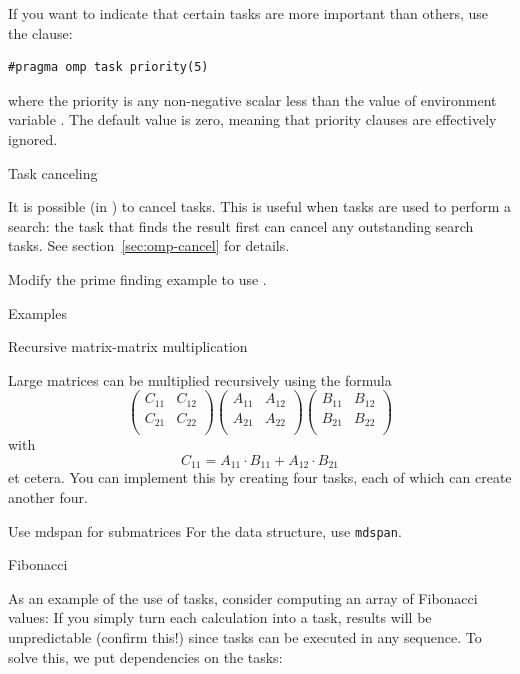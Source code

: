 If you want to indicate that certain tasks are more important
than others, use the  clause:
\begin{lstlisting}[language=omp]
#pragma omp task priority(5)
\end{lstlisting}
where the priority is any non-negative scalar
less than the value of environment variable .
The default value is zero, meaning that priority clauses are effectively ignored.

 {Task canceling}

It is possible (in ) to cancel
tasks. This is useful when tasks are used to perform a search: the
task that finds the result first can cancel any outstanding search
tasks.
See section~\ref{sec:omp-cancel} for details.

\begin{exercise}
  Modify the prime finding example to use .
\end{exercise}

 {Examples}

 {Recursive matrix-matrix multiplication}

Large matrices can be multiplied recursively using the formula
\[ 
\begin{pmatrix}
  C_{11}&C_{12}\\ C_{21}&C_{22}\\
\end{pmatrix}
\begin{pmatrix}
  A_{11}&A_{12}\\ A_{21}&A_{22}\\
\end{pmatrix}
\begin{pmatrix}
  B_{11}&B_{12}\\ B_{21}&B_{22}\\
\end{pmatrix}
\]
with
\[ C_{11} = A_{11}\cdot B_{11} + A_{12}\cdot B_{21} \]
et cetera.
You can implement this by creating four tasks, each of which can create another four.

\begin{cppnote}{Use mdspan for submatrices}
  For the data structure, use \lstinline{mdspan}.
\end{cppnote}

 {Fibonacci}

As an example of the use of tasks, consider computing an array of Fibonacci values:
%
%
If you simply turn each calculation into a task, results will be
unpredictable (confirm this!) since tasks can be executed in any sequence.
To solve this, we put dependencies on the tasks:
%

